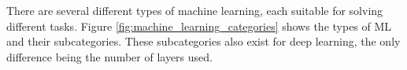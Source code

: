 
There are several different types of machine learning, each suitable for solving different tasks. Figure \ref{fig:machine_learning_categories} shows the types of ML and their subcategories. These subcategories also exist for deep learning, the only difference being the number of layers used.

 

